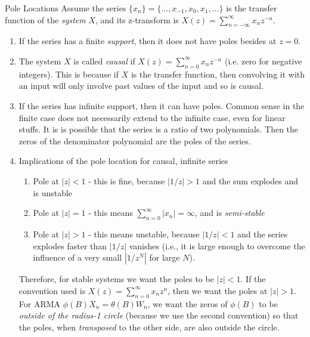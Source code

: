 \documentclass{article}
\begin{document}
\begin{section}{Pole Locations}
Assume the series $\{x_{n}\} = \{\ldots, x_{-1}, x_{0}, x_{1}, \ldots\}$ 
is the transfer function of the \emph{system} $X$, and its z-transform is 
$X(z) = \sum_{n=-\infty}^{\infty} x_{n} z^{-n}$.
\begin{enumerate}
\item If the series has a finite \emph{support}, then it does not have poles
besides at $z = 0$.
\item The system $X$ is called \emph{causal} if 
$X(z) = \sum_{n=0}^{\infty} x_{n} z^{-n}$ (i.e. zero for negative integers). 
This is because if $X$ is the transfer function, then convolving it with
an input will only involve past values of the input and so is causal.
\item If the series has infinite support, then it can have poles. Common
sense in the finite case does not necessarily extend to the infinite case,
even for linear stuffs. It is is possible that the series is a 
ratio of two polynomials. Then the zeros of the denominator polynomial
are the poles of the series.
\item Implications of the pole location for causal, infinite series
  \begin{enumerate}
  \item Pole at $|z| < 1$ - this is fine, because $|1/z| > 1$ and the sum
  explodes and is unstable
  \item Pole at $|z| = 1$ - this means $\sum_{n=0}^{\infty} |x_{n}| = \infty$,
  and is \emph{semi-stable}
  \item Pole at $|z| > 1$ - this means unstable, because $|1/z| < 1$ and
  the series explodes faster than $|1/z|$ vanishes (i.e., it is large enough
  to overcome the influence of a very small $|1/z^{N}|$ for large $N$).
  \end{enumerate}
\noindent Therefore, for stable systems we want the poles to be $|z| < 1$. 
If the convention used is $X(z) = \sum_{n=0}^{\infty} x_{n} z^{n}$, then
we want the poles at $|z| > 1$.\\
For ARMA $\phi(B)X_{n} = \theta(B)W_{n}$, we want the zeros of $\phi(B)$ to
be \emph{outside of the radius-1 circle} (because we use the second convention)
so that the poles, when \emph{transposed} to the other side, are also
outside the circle.
\end{enumerate}
\end{section}
\end{document}
